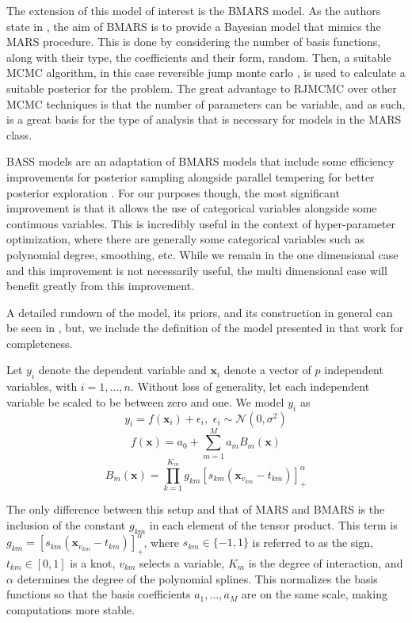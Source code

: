 The extension of this model of interest is the BMARS model. As the authors state in \cite{denison1998bayesian}, the aim of BMARS is to provide a Bayesian model that mimics the MARS procedure. This is done by considering the number of basis functions, along with their type, the coefficients and their form, random. Then, a suitable MCMC algorithm, in this case reversible jump monte carlo \cite{green1995reversible}, is used to calculate a suitable posterior for the problem. The great advantage to RJMCMC over other MCMC techniques is that the number of parameters can be variable, and as such, is a great basis for the type of analysis that is necessary for models in the MARS class. 

BASS models are an adaptation of BMARS models that include some efficiency improvements for posterior sampling alongside parallel tempering for better posterior exploration \cite{francom2020bass}. For our purposes though, the most significant improvement is that it allows the use of categorical variables alongside some continuous variables. This is incredibly useful in the context of hyper-parameter optimization, where there are generally some categorical variables such as polynomial degree, smoothing, etc. While we remain in the one dimensional case and this improvement is not necessarily useful, the multi dimensional case will benefit greatly from this improvement. 

A detailed rundown of the model, its priors, and its construction in general can be seen in \cite{francom2020bass}, but, we include the definition of the model presented in that work for completeness. 

Let $y_i$ denote the dependent variable and $\boldsymbol{x}_i$ denote a vector of $p$ independent variables, with $i = 1, \ldots, n$. Without loss of generality, let each independent variable be scaled to be between
zero and one. We model $y_i$ as 
\[ y_i = f(\boldsymbol{x}_i) + \epsilon_i, \, \, \epsilon_i \sim \mathcal{N}(0,\sigma^2) \]
\[ f(\boldsymbol{x}) = a_0 + \sum_{m=1}^{M} a_m B_m(\boldsymbol{x}) \]
\[ B_m(\boldsymbol{x}) = \prod_{k=1}^{K_m} g_{km} [s_{km}(\boldsymbol{x}_{v_{km}} - t_{km}) ]^\alpha_+ \]

The only difference between this setup and that of MARS and BMARS is the inclusion of the constant $g_{km}$ in each element of the tensor product. This term is $g_{km}=[s_{km}(\boldsymbol{x}_{v_{km}} - t_{km}) ]^\alpha_+$, where $s_{km} \in \{-1,1\}$ is referred to as the sign, $t_{km}\in [0,1]$ is a knot, $v_{km}$ selects a variable, $K_m$ is the degree of interaction, and $\alpha$ determines the degree of the polynomial splines. This normalizes the basis functions so that the basis coefficients $a_1, \ldots, a_M$ are on the same scale, making computations more stable.

